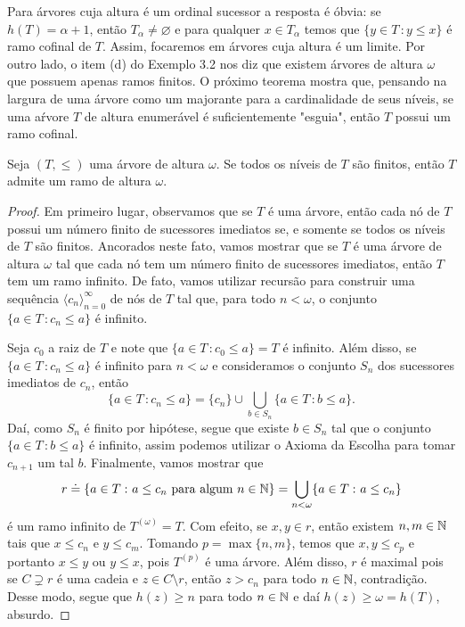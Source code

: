 \documentclass[a4paper]{article}
\begin{document}
  Para árvores cuja altura é um ordinal sucessor a resposta é óbvia: se \(h(T)=\alpha +1\),
  então \(T_\alpha\neq\varnothing\) e para qualquer \(x\in T_\alpha\) temos que
  \(\{y\in T \,\colon y\leq x\}\) é ramo cofinal de \(T\). Assim, focaremos em
  árvores cuja altura é um limite. Por outro lado, o item (d) do Exemplo 3.2 nos diz que
  existem árvores de altura \(\omega\) que possuem apenas ramos finitos. O
  próximo teorema mostra que,  pensando na largura de uma árvore como um
  majorante para a cardinalidade de seus níveis, se uma aŕvore \(T\) de altura
  enumerável é suficientemente "esguia", então \(T\) possui um ramo cofinal.

  \begin{teo}
  Seja \((T,\leq)\) uma árvore de altura \(\omega\). Se todos os níveis de \(T\) são finitos, então
  \(T\) admite um ramo de altura \(\omega\).
  \end{teo}
\begin{proof}
  Em primeiro lugar, observamos que se  \(T\) é uma árvore, então cada nó de \(T\) possui
  um número finito de sucessores imediatos se, e somente se todos os níveis de
  \(T\) são finitos. Ancorados neste fato, vamos mostrar que se \(T\) é uma
  árvore de altura \(\omega\) tal que cada nó tem um número finito de sucessores
  imediatos,  então \(T\) tem um ramo infinito. De fato, vamos utilizar recursão
  para  construir uma sequência \(\langle c_n\rangle_{n=0}^{\infty}\)  de nós de
  \(T\) tal que, para todo \(n<\omega\), o conjunto \(\{a\in T\,\colon c_n\leq a\}\) é
  infinito.

  Seja \(c_0\) a raiz de \(T\) e  note que \(\{a \in T\,\colon c_{0} \leq a \}= T\)
  é infinito. Além disso, se \(\{a\in T\,\colon c_n\leq a\}\) é infinito para
  \(n<\omega\) e consideramos  o
  conjunto \(S_n\) dos sucessores imediatos de \(c_n\), então
  \[
  \{a\in T\,\colon c_n\leq a\} = \{c_n\} \cup\bigcup_{b\in S_n} \{a\in T\,\colon b\leq a\}.
  \]
 Daí, como \(S_n\) é finito por hipótese, segue que existe \(b\in S_n\) tal que
 o conjunto \(\{a\in T\,\colon b\leq a\}\) é infinito, assim podemos utilizar o
 Axioma da Escolha para tomar \(c_{n+1}\) um tal \(b\). 
 Finalmente, vamos mostrar que
  \[r\doteq\{a\in T\,\colon a\leq c_n \text{ para algum }
    n\in\mathbb{N}\}=\bigcup_{n <\omega}\{a\in T\,\colon a\leq c_n\}\]
  é um ramo infinito de \(T^{(\omega)}=T\).
  Com efeito, se \(x,y\in r\), então existem \(n,m\in\mathbb{N}\) tais que
  \(x\leq c_n\) e \(y\leq c_m\).
  Tomando \(p=\max\{n,m\}\), temos que \(x,y\leq c_p\) e portanto  \(x\leq y\) ou
  \(y\leq x\),  pois \(T^{(p)}\) é uma árvore. Além disso, \(r\) é maximal pois se
  \(C\supsetneq r\) é uma  cadeia e \(z\in C\setminus r\), então \(z>c_n\)
  para todo \(n\in\mathbb{N}\), contradição. Desse modo, segue que \(h(z)\geq n\)
  para todo \(n\in\mathbb{N}\) e daí \(h(z)\geq\omega=h(T)\), absurdo.
  \end{proof}
\end{document}
